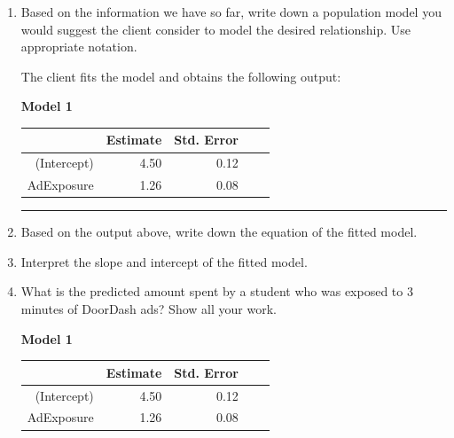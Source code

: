 \documentclass[11pt]{article}
\begin{document}
\begin{enumerate}

\item Based on the information we have so far, write down a population model you would suggest the client consider to model the desired relationship. Use appropriate notation. 



\pagebreak


The client fits the model and obtains the following output: 

\textbf{Model 1} 

\begin{center}
\begin{tabular}{rrrrr}
  \hline
             & Estimate & Std. Error \\
  \hline
(Intercept)    & 4.50 & 0.12    \\
 AdExposure    & 1.26 & 0.08 \\
  \hline
\end{tabular}
\end{center}

\rule{\textwidth}{1pt}

\item Based on the output above, write down the equation of the fitted model. 



\vspace{4cm} 


\item Interpret the slope and intercept of the fitted model. 

\vspace{5cm}

\item What is the predicted amount spent by a student who was exposed to 3 minutes of DoorDash ads? Show all your work.


\pagebreak




\textbf{Model 1} 

\begin{center}
\begin{tabular}{rrrrr}
  \hline
             & Estimate & Std. Error \\
  \hline
(Intercept)    & 4.50 & 0.12    \\
 AdExposure    & 1.26 & 0.08 \\
  \hline
\end{tabular}
\end{center}


\end{enumerate}
\end{document}
